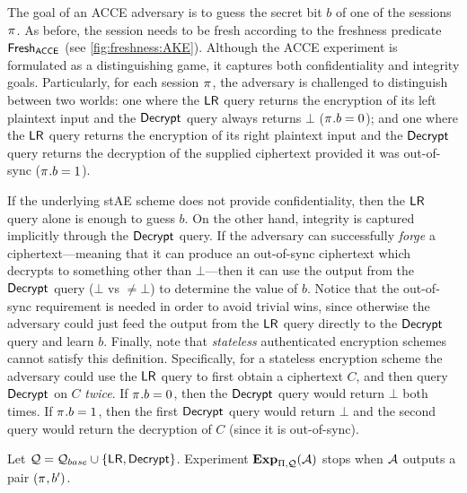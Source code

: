 The goal of an ACCE adversary is to guess the secret bit $b$ of one of the sessions $\oracle$.
As before,
the session needs to be fresh according to the freshness predicate $\mathsf{Fresh}_{\mathsf{ACCE}}$ (see \cref{fig:freshness:AKE}).
Although the ACCE experiment is formulated as a distinguishing game,
it captures both confidentiality and integrity goals. 
Particularly,
for each session $\oracle$,
the adversary is challenged to distinguish between two worlds:
one where the $\mathsf{LR}$ query returns the encryption of its left plaintext input and the $\mathsf{Decrypt}$ query always returns $\bot$ ($\oracle.b = 0$);
and one where the $\mathsf{LR}$ query returns the encryption of its right plaintext input and the $\mathsf{Decrypt}$ query returns the decryption of the supplied ciphertext provided it was out-of-sync  ($\oracle.b = 1$).

If the underlying stAE scheme does not provide confidentiality,
then the $\mathsf{LR}$ query alone is enough to guess $b$.
On the other hand,
integrity is captured implicitly through the $\mathsf{Decrypt}$ query.
If the adversary can successfully \emph{forge} a ciphertext---meaning that it can produce an out-of-sync ciphertext which decrypts to something other than $\bot$---then 
it can use the output from the $\mathsf{Decrypt}$ query ($\bot$ vs $\neq \bot$) to determine the value of $b$.
Notice that the out-of-sync requirement is needed in order to avoid trivial wins,
since otherwise the adversary could just feed the output from the $\mathsf{LR}$ query directly to the $\mathsf{Decrypt}$ query and learn $b$.
Finally,
note that \emph{stateless} authenticated encryption schemes cannot satisfy this definition.
Specifically,
for a stateless encryption scheme the adversary could use the $\mathsf{LR}$ query to first obtain a ciphertext $C$,
and then query $\mathsf{Decrypt}$ on $C$ \emph{twice}.
If $\oracle.b = 0$, then the $\mathsf{Decrypt}$ query would return $\bot$ both times.
If  $\oracle.b = 1$, then the first $\mathsf{Decrypt}$ query would return $\bot$ and the second query would return the decryption of $C$
(since it is out-of-sync).


 


Let $\mathcal{Q} = \mathcal{Q}_{base} \allowbreak \cup \allowbreak \lbrace \mathsf{LR}, \allowbreak \mathsf{Decrypt}  \rbrace$.
Experiment $\mathbf{Exp}_{\mathrm{\Pi},\mathcal{Q}}^{}(\mathcal{A})$ stops when $\mathcal{A}$ outputs a pair $(\oracle, b')$.

